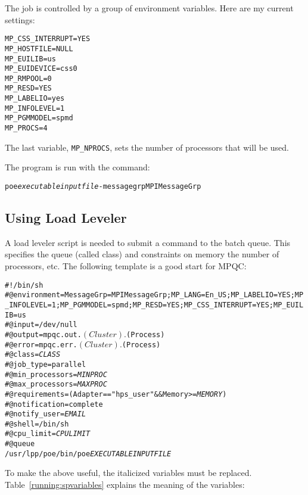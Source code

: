 The job is controlled by a group of environment variables.
Here are my current settings:
\begin{verbatim}
MP_CSS_INTERRUPT=YES
MP_HOSTFILE=NULL
MP_EUILIB=us
MP_EUIDEVICE=css0
MP_RMPOOL=0
MP_RESD=YES
MP_LABELIO=yes
MP_INFOLEVEL=1
MP_PGMMODEL=spmd
MP_PROCS=4
\end{verbatim}
The last variable, \verb|MP_NPROCS|, sets the number
of processors that will be used.

The program is run with the command:
\begin{alltt}
poe {\itshape executable} {\itshape inputfile} -messagegrp MPIMessageGrp
\end{alltt}

\subsection{Using Load Leveler}

A load leveler script is needed to submit a command to the batch queue.
This specifies the queue (called class) and constraints on memory the
number of processors, etc.  The following template is a good start for
MPQC:

\begin{alltt}
#!/bin/sh
#@ environment = MessageGrp=MPIMessageGrp;MP_LANG=En_US;MP_LABELIO=YES;MP_INFOLEVEL=1;MP_PGMMODEL=spmd;MP_RESD=YES;MP_CSS_INTERRUPT=YES;MP_EUILIB=us
#@ input = /dev/null
#@ output = mpqc.out.$(Cluster).$(Process)
#@ error = mpqc.err.$(Cluster).$(Process)
#@ class = {\itshape CLASS}
#@ job_type = parallel
#@ min_processors = {\itshape MINPROC}
#@ max_processors = {\itshape MAXPROC}
#@ requirements =  (Adapter == "hps_user" && Memory >= {\itshape MEMORY})
#@ notification = complete
#@ notify_user = {\itshape EMAIL}
#@ shell = /bin/sh
#@ cpu_limit = {\itshape CPULIMIT}
#@ queue
/usr/lpp/poe/bin/poe {\itshape EXECUTABLE} {\itshape INPUTFILE}
\end{alltt}

To make the above useful, the italicized variables must be replaced.
Table~\ref{running:spvariables} explains the meaning of the variables:

